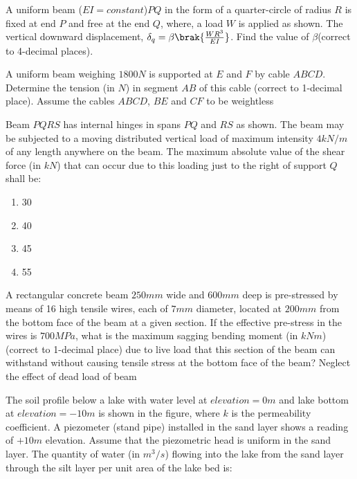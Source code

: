     		
    		
	\item
	A uniform beam ($EI = constant$)$PQ$ in the form of a quarter-circle of radius $R$ is fixed at end $P$ and free at the end $Q$, where, a load $W$ is applied as shown. The vertical downward displacement, $\delta_{q} = \beta\brak{\frac{W R^{3}}{EI}}$. Find the value of $\beta$(correct to 4-decimal places).
	
	
    		
    		
	
	\item
	A uniform beam weighing $1800 N$ is supported at $E$ and $F$ by cable $ABCD$. Determine the tension (in $N$) in segment $AB$ of this cable (correct to 1-decimal place). Assume the cables $ABCD$, $BE$ and $CF$ to be weightless
	
	
    		
    		

	
	\item
	Beam $PQRS$ has internal hinges in spans $PQ$ and $RS$ as shown. The beam may be subjected to a moving distributed vertical load of maximum intensity $4 kN/m$ of any length anywhere on the beam. The maximum absolute value of the shear force (in $kN$) that can occur due to this loading just to the right of support $Q$ shall be:
	
    		
    		

		\begin{enumerate}
			\item 30
			\item 40
			\item 45
			\item 55
		\end{enumerate}
	\item
	A rectangular concrete beam $250 mm$ wide and $600 mm$ deep is pre-stressed by means of 16 high tensile wires, each of $7 mm$ diameter, located at $200 mm$ from the bottom face of the beam at a given section. If the effective pre-stress in the wires is $700 MPa$, what is the maximum sagging bending moment (in $kNm$) (correct to 1-decimal place) due to live load that this section of the beam can withstand without causing tensile stress at the bottom face of the beam? Neglect the effect of dead load of beam
	\item
	The soil profile below a lake with water level at $elevation = 0m$ and lake bottom at $elevation = -10 m$ is shown in the figure, where $k$ is the permeability coefficient. A piezometer (stand pipe) installed in the sand layer shows a reading of $+10 m$ elevation. Assume that the piezometric head is uniform in the sand layer. The quantity of water (in $m^3/s$) flowing into the lake from the sand layer through the silt layer per unit area of the lake bed is:
	
